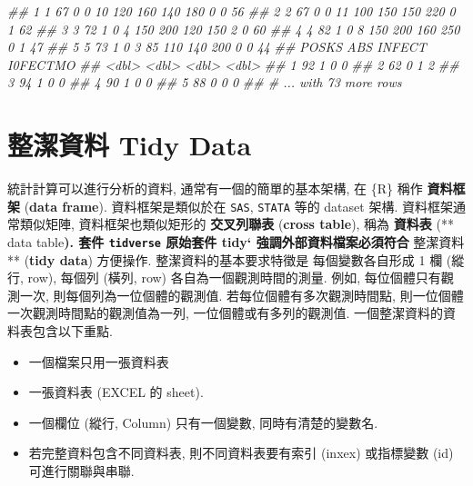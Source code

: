 \documentclass[
]{book}
\newenvironment{Shaded}{\begin{snugshade}}{\end{snugshade}}
\newcommand{\CommentTok}[1]{\textcolor[rgb]{0.56,0.35,0.01}{\textit{#1}}}
\providecommand{\tightlist}{%
  \setlength{\itemsep}{0pt}\setlength{\parskip}{0pt}}
\begin{document}
\begin{Shaded}
\begin{Highlighting}[]
\CommentTok{\#\# 1     1    67     0     0    10   120   160    140    180          0     0    56}
\CommentTok{\#\# 2     2    67     0     0    11   100   150    150    220          0     1    62}
\CommentTok{\#\# 3     3    72     1     0     4   150   200    120    150          2     0    60}
\CommentTok{\#\# 4     4    82     1     0     8   150   200    160    250          0     1    47}
\CommentTok{\#\# 5     5    73     1     0     3    85   110    140    200          0     0    44}
\CommentTok{\#\#   POSKS   ABS INFECT I0FECTMO}
\CommentTok{\#\#   \textless{}dbl\textgreater{} \textless{}dbl\textgreater{}  \textless{}dbl\textgreater{}    \textless{}dbl\textgreater{}}
\CommentTok{\#\# 1    92     1      0        0}
\CommentTok{\#\# 2    62     0      1        2}
\CommentTok{\#\# 3    94     1      0        0}
\CommentTok{\#\# 4    90     1      0        0}
\CommentTok{\#\# 5    88     0      0        0}
\CommentTok{\#\# \# ... with 73 more rows}
\end{Highlighting}
\end{Shaded}

\hypertarget{ux6574ux6f54ux8cc7ux6599-tidy-data}{%
\section{整潔資料 Tidy Data}\label{ux6574ux6f54ux8cc7ux6599-tidy-data}}

統計計算可以進行分析的資料,
通常有一個的簡單的基本架構,
在 \{R\} 稱作
\textbf{資料框架}
(\textbf{data frame}).
資料框架是類似於在 \texttt{SAS}, \texttt{STATA} 等的 dataset 架構.
資料框架通常類似矩陣,
資料框架也類似矩形的
\textbf{交叉列聯表}
(\textbf{cross table}),
稱為
\textbf{資料表}
(** data table\textbf{).
套件 \texttt{tidverse} 原始套件 tidy` 強調外部資料檔案必須符合
}整潔資料** (\textbf{tidy data}) 方便操作.
整潔資料的基本要求特徵是
每個變數各自形成 1 欄 (縱行, row),
每個列 (橫列, row) 各自為一個觀測時間的測量.
例如, 每位個體只有觀測一次,
則每個列為一位個體的觀測值.
若每位個體有多次觀測時間點,
則一位個體一次觀測時間點的觀測值為一列,
一位個體或有多列的觀測值.
一個整潔資料的資料表包含以下重點.

\begin{itemize}
\tightlist
\item
  一個檔案只用一張資料表
\item
  一張資料表 (EXCEL 的 sheet).
\item
  一個欄位 (縱行, Column) 只有一個變數, 同時有清楚的變數名.
\item
  若完整資料包含不同資料表, 則不同資料表要有索引 (inxex) 或指標變數 (id) 可進行關聯與串聯.
\end{itemize}
\end{document}
